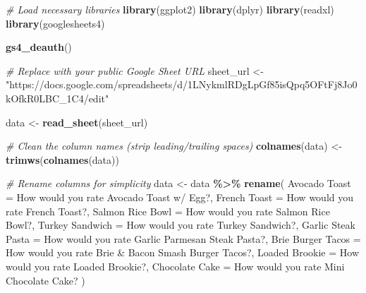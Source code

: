 \documentclass[
]{book}
\newenvironment{Shaded}{\begin{snugshade}}{\end{snugshade}}
\newcommand{\AttributeTok}[1]{\textcolor[rgb]{0.13,0.29,0.53}{#1}}
\newcommand{\CommentTok}[1]{\textcolor[rgb]{0.56,0.35,0.01}{\textit{#1}}}
\newcommand{\FunctionTok}[1]{\textcolor[rgb]{0.13,0.29,0.53}{\textbf{#1}}}
\newcommand{\NormalTok}[1]{#1}
\newcommand{\OtherTok}[1]{\textcolor[rgb]{0.56,0.35,0.01}{#1}}
\newcommand{\SpecialCharTok}[1]{\textcolor[rgb]{0.81,0.36,0.00}{\textbf{#1}}}
\newcommand{\StringTok}[1]{\textcolor[rgb]{0.31,0.60,0.02}{#1}}
\begin{document}
\begin{Shaded}
\begin{Highlighting}[]
\CommentTok{\# Load necessary libraries}
\FunctionTok{library}\NormalTok{(ggplot2)}
\FunctionTok{library}\NormalTok{(dplyr)}
\FunctionTok{library}\NormalTok{(readxl)}
\FunctionTok{library}\NormalTok{(googlesheets4)}

\FunctionTok{gs4\_deauth}\NormalTok{()}

\CommentTok{\# Replace with your public Google Sheet URL}
\NormalTok{sheet\_url }\OtherTok{\textless{}{-}} \StringTok{"https://docs.google.com/spreadsheets/d/1LNykmlRDgLpGf85isQpq5OFtFj8Jo0kOfkR0LBC\_1C4/edit"}

\NormalTok{data }\OtherTok{\textless{}{-}} \FunctionTok{read\_sheet}\NormalTok{(sheet\_url)}

\CommentTok{\# Clean the column names (strip leading/trailing spaces)}
\FunctionTok{colnames}\NormalTok{(data) }\OtherTok{\textless{}{-}} \FunctionTok{trimws}\NormalTok{(}\FunctionTok{colnames}\NormalTok{(data))}

\CommentTok{\# Rename columns for simplicity}
\NormalTok{data }\OtherTok{\textless{}{-}}\NormalTok{ data }\SpecialCharTok{\%\textgreater{}\%}
  \FunctionTok{rename}\NormalTok{(}
    \StringTok{\textasciigrave{}}\AttributeTok{Avocado Toast}\StringTok{\textasciigrave{}} \OtherTok{=} \StringTok{\textasciigrave{}}\AttributeTok{How would you rate Avocado Toast w/ Egg?}\StringTok{\textasciigrave{}}\NormalTok{,}
    \StringTok{\textasciigrave{}}\AttributeTok{French Toast}\StringTok{\textasciigrave{}} \OtherTok{=} \StringTok{\textasciigrave{}}\AttributeTok{How would you rate French Toast?}\StringTok{\textasciigrave{}}\NormalTok{,}
    \StringTok{\textasciigrave{}}\AttributeTok{Salmon Rice Bowl}\StringTok{\textasciigrave{}} \OtherTok{=} \StringTok{\textasciigrave{}}\AttributeTok{How would you rate Salmon Rice Bowl?}\StringTok{\textasciigrave{}}\NormalTok{,}
    \StringTok{\textasciigrave{}}\AttributeTok{Turkey Sandwich}\StringTok{\textasciigrave{}} \OtherTok{=} \StringTok{\textasciigrave{}}\AttributeTok{How would you rate Turkey Sandwich?}\StringTok{\textasciigrave{}}\NormalTok{,}
    \StringTok{\textasciigrave{}}\AttributeTok{Garlic Steak Pasta}\StringTok{\textasciigrave{}} \OtherTok{=} \StringTok{\textasciigrave{}}\AttributeTok{How would you rate Garlic Parmesan Steak Pasta?}\StringTok{\textasciigrave{}}\NormalTok{,}
    \StringTok{\textasciigrave{}}\AttributeTok{Brie Burger Tacos}\StringTok{\textasciigrave{}} \OtherTok{=} \StringTok{\textasciigrave{}}\AttributeTok{How would you rate Brie \& Bacon Smash Burger Tacos?}\StringTok{\textasciigrave{}}\NormalTok{,}
    \StringTok{\textasciigrave{}}\AttributeTok{Loaded Brookie}\StringTok{\textasciigrave{}} \OtherTok{=} \StringTok{\textasciigrave{}}\AttributeTok{How would you rate Loaded Brookie?}\StringTok{\textasciigrave{}}\NormalTok{,}
    \StringTok{\textasciigrave{}}\AttributeTok{Chocolate Cake}\StringTok{\textasciigrave{}} \OtherTok{=} \StringTok{\textasciigrave{}}\AttributeTok{How would you rate Mini Chocolate Cake?}\StringTok{\textasciigrave{}}
\NormalTok{  )}


\end{Highlighting}
\end{Shaded}
\end{document}
